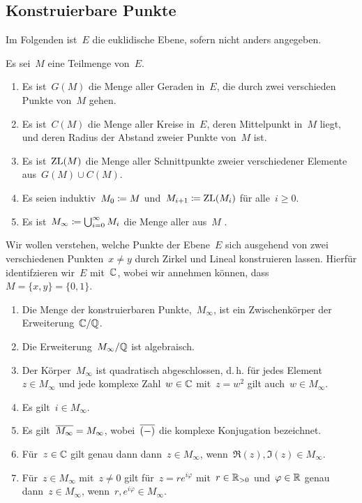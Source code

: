 \subsection{Konstruierbare Punkte}

\begin{convention}
  Im Folgenden ist~$E$ die euklidische Ebene, sofern nicht anders angegeben.
\end{convention}

\begin{definition}
  Es sei~$M$ eine Teilmenge von~$E$.
  \begin{enumerate}
    \item
      Es ist~$G(M)$ die Menge aller Geraden in~$E$, die durch zwei verschieden Punkte von~$M$ gehen.
    \item
      Es ist~$C(M)$ die Menge aller Kreise in~$E$, deren Mittelpunkt in~$M$ liegt, und deren Radius der Abstand zweier Punkte von~$M$ ist.
    \item
      Es ist~$\operatorname{ZL}(M)$ die Menge aller Schnittpunkte zweier verschiedener Elemente aus~$G(M) \cup C(M)$.
    \item
      Es seien induktiv~$M_0 \coloneqq M$ und~$M_{i+1} \coloneqq \operatorname{ZL}(M_i)$ für alle~$i \geq 0$.
    \item
      Es ist~$M_{\infty} \coloneqq \bigcup_{i=0}^\infty M_i$ die Menge aller aus~$M$ .
  \end{enumerate}
\end{definition}

Wir wollen verstehen, welche Punkte der Ebene~$E$ sich ausgehend von zwei verschiedenen Punkten~$x \neq y$ durch Zirkel und Lineal konstruieren lassen.
Hierfür identifzieren wir~$E$ mit~$\mathbb{C}$, wobei wir annehmen können, dass~$M = \{ x, y \} = \{ 0, 1 \}$.

\begin{theorem}
  \leavevmode
  \begin{enumerate}
    \item
      Die Menge der konstruierbaren Punkte,~$M_{\infty}$, ist ein Zwischenkörper der Erweiterung~$\mathbb{C} / \mathbb{Q}$.
    \item
      Die Erweiterung~$M_{\infty} / \mathbb{Q}$ ist algebraisch.
    \item
      Der Körper~$M_{\infty}$ ist quadratisch abgeschlossen, d.\,h. für jedes Element~$z \in M_{\infty}$ und jede komplexe Zahl~$w \in \mathbb{C}$ mit~$z = w^2$ gilt auch~$w \in M_{\infty}$.
    \item
      Es gilt~$i \in M_{\infty}$.
    \item
      Es gilt~$\overline{M_{\infty}} = M_{\infty}$, wobei~$\overline{(-)}$ die komplexe Konjugation bezeichnet.
    \item
      Für~$z \in \mathbb{C}$ gilt genau dann dann~$z \in M_{\infty}$, wenn~$\Re(z), \Im(z) \in M_{\infty}$.
    \item
      Für~$z \in M_{\infty}$ mit~$z \neq 0$ gilt für~$z = r e^{i \varphi}$ mit~$r \in \mathbb{R}_{>0}$ und~$\varphi \in \mathbb{R}$ genau dann~$z \in M_{\infty}$, wenn~$r, e^{i \varphi} \in M_{\infty}$.
  \end{enumerate}
\end{theorem}

